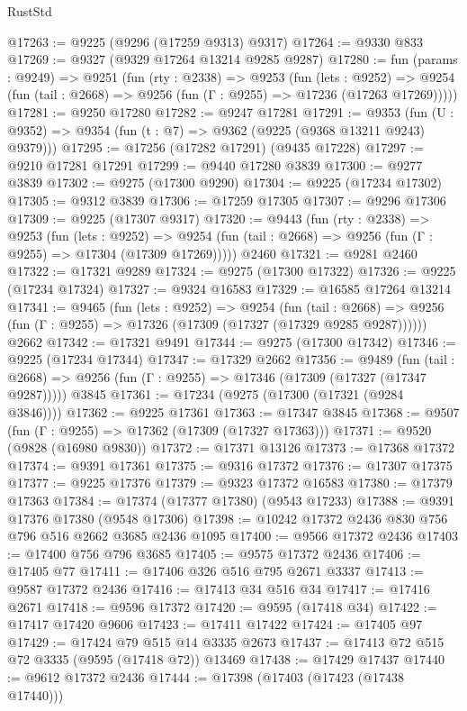 \begin{lexlean}{RustStd}
\begin{coremodule}
@17263 := @9225 (@9296 (@17259 @9313) @9317)
@17264 := @9330 @833
@17269 := @9327 (@9329 @17264 @13214 @9285 @9287)
@17280 := fun (params : @9249) =>
  @9251
    (fun (rty : @2338) =>
    @9253
      (fun (lets : @9252) =>
      @9254 (fun (tail : @2668) => @9256 (fun (Γ : @9255) => @17236 (@17263 @17269)))))
@17281 := @9250 @17280
@17282 := @9247 @17281
@17291 := @9353
    (fun (U : @9352) => @9354 (fun (t : @7) => @9362 (@9225 (@9368 @13211 @9243) @9379)))
@17295 := @17256 (@17282 @17291) (@9435 @17228)
@17297 := @9210 @17281 @17291
@17299 := @9440 @17280 @3839
@17300 := @9277 @3839
@17302 := @9275 (@17300 @9290)
@17304 := @9225 (@17234 @17302)
@17305 := @9312 @3839
@17306 := @17259 @17305
@17307 := @9296 @17306
@17309 := @9225 (@17307 @9317)
@17320 := @9443
    (fun (rty : @2338) =>
    @9253
      (fun (lets : @9252) =>
      @9254 (fun (tail : @2668) => @9256 (fun (Γ : @9255) => @17304 (@17309 @17269)))))
    @2460
@17321 := @9281 @2460
@17322 := @17321 @9289
@17324 := @9275 (@17300 @17322)
@17326 := @9225 (@17234 @17324)
@17327 := @9324 @16583
@17329 := @16585 @17264 @13214
@17341 := @9465
    (fun (lets : @9252) =>
    @9254
      (fun (tail : @2668) =>
      @9256 (fun (Γ : @9255) => @17326 (@17309 (@17327 (@17329 @9285 @9287))))))
    @2662
@17342 := @17321 @9491
@17344 := @9275 (@17300 @17342)
@17346 := @9225 (@17234 @17344)
@17347 := @17329 @2662
@17356 := @9489
    (fun (tail : @2668) => @9256 (fun (Γ : @9255) => @17346 (@17309 (@17327 (@17347 @9287)))))
    @3845
@17361 := @17234 (@9275 (@17300 (@17321 (@9284 @3846))))
@17362 := @9225 @17361
@17363 := @17347 @3845
@17368 := @9507 (fun (Γ : @9255) => @17362 (@17309 (@17327 @17363)))
@17371 := @9520 (@9828 (@16980 @9830))
@17372 := @17371 @13126
@17373 := @17368 @17372
@17374 := @9391 @17361
@17375 := @9316 @17372
@17376 := @17307 @17375
@17377 := @9225 @17376
@17379 := @9323 @17372 @16583
@17380 := @17379 @17363
@17384 := @17374 (@17377 @17380) (@9543 @17233)
@17388 := @9391 @17376 @17380 (@9548 @17306)
@17398 := @10242 @17372 @2436 @830 @756 @796 @516 @2662 @3685 @2436 @1095
@17400 := @9566 @17372 @2436
@17403 := @17400 @756 @796 @3685
@17405 := @9575 @17372 @2436
@17406 := @17405 @77
@17411 := @17406 @326 @516 @795 @2671 @3337
@17413 := @9587 @17372 @2436
@17416 := @17413 @34 @516 @34
@17417 := @17416 @2671
@17418 := @9596 @17372
@17420 := @9595 (@17418 @34)
@17422 := @17417 @17420 @9606
@17423 := @17411 @17422
@17424 := @17405 @97
@17429 := @17424 @79 @515 @14 @3335 @2673
@17437 := @17413 @72 @515 @72 @3335 (@9595 (@17418 @72)) @13469
@17438 := @17429 @17437
@17440 := @9612 @17372 @2436
@17444 := @17398 (@17403 (@17423 (@17438 @17440)))

\end{coremodule}
\end{lexlean}
